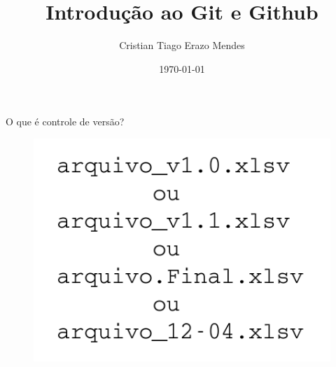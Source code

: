 \documentclass[12pt]{beamer}
\title[Introdução a Git e Github]{\centering Introdução ao Git e Github}
\author[Cristian Tiago E. Mendes]{Cristian Tiago Erazo Mendes\\
  }
\institute[]{Universidade Federal de Lavras}
\date{\today}
\begin{document}

\maketitle


\footnotesize
\justifying



\begin{frame}{O que é controle de versão?}
	\begin{figure}[!htb]
		\centering
		\includegraphics[scale=0.5]{figuras/fig1.png} 
		\label{fig:fig1} %
	\end{figure}
\end{frame}

\end{document}
